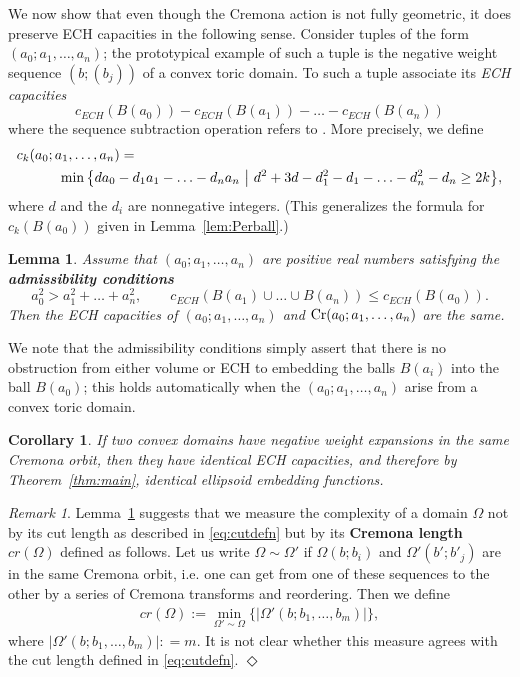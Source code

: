 \documentclass[11pt, reqno]{amsart}
\newtheorem{lemma}[thm]{Lemma}
\newtheorem{cor}[thm]{Corollary}
\theoremstyle{remark}
\numberwithin{equation}{subsection}
\numberwithin{figure}{section}
\theoremstyle{customremark}
\newtheorem{rmk_no_diamond}[thm]{Remark}
\newenvironment{rmk}{\begin{rmk_no_diamond} } {\hfill$\er$ \end{rmk_no_diamond}}
\newcommand{\Om}{{\Omega}}
\newcommand{\er}{{\Diamond}}
\begin{document}
We now show that even though the Cremona action is not fully geometric, it does preserve ECH capacities in the following sense.   Consider tuples of the form $(a_0; a_1, \ldots, a_n)$; 
the prototypical example of such a tuple is the negative weight sequence $(b; (b_j))$  of a convex toric domain.  To such a tuple associate its {\em ECH capacities} 
\[ c_{ECH}(B(a_0)) - c_{ECH}(B(a_1)) - \ldots - c_{ECH}(B(a_n))\] 
where the sequence subtraction operation refers to \cite{Hutchingsblog}.   More precisely, 
we define
\begin{align} &c_k(a_0; a_1, \ldots, a_n) =\\ \notag 
&\qquad\quad \min \big\{ d a_0 - d_1 a_1 - \ldots- d_n a_n\ \big|\  d^2 + 3d - d_1^2 - d_1 - \ldots - d_n^2 - d_n \ge 2k \big\},
\end{align}
where $d$ and the $d_i$ are nonnegative integers.  (This generalizes the formula for 
$ c_{k}(B(a_0))$ given in Lemma~\ref{lem:Perball}.)



\vspace{2 mm}
\begin{lemma}\label{lem:CremECH}
Assume that $(a_0; a_1, \ldots, a_n)$ are positive real numbers satisfying the {\bf admissibility conditions}
\[ a_0^2 > a_1^2 + \ldots + a_n^2, \quad \quad c_{ECH}( B(a_1) \cup \ldots \cup B(a_n) ) \le c_{ECH}( B(a_0) ).\]
Then the ECH capacities of $(a_0; a_1, \ldots, a_n)$ and 
${\rm Cr}(a_0; a_1, \ldots, a_n)$ are the same.
\end{lemma}

We note that the admissibility conditions simply assert that there is no obstruction from either volume or ECH to embedding the balls $B(a_i)$ into the ball $B(a_0)$; this holds automatically when the $(a_0;a_1,\ldots,a_n)$ arise from a convex toric domain.

\begin{cor}  If two convex domains have negative weight expansions in the same Cremona orbit, then they have identical ECH capacities, and therefore by Theorem~\ref{thm:main}, identical ellipsoid embedding functions. 
\end{cor}

\begin{rmk}\label{rmk:Crem} \rm  Lemma~\ref{lem:CremECH} suggests that we  measure the complexity of a domain $\Om$ not by its cut length as described in \eqref{eq:cutdefn}  but by its {\bf Cremona length}
$cr(\Omega)$ defined as follows. Let us write  $\Om\sim \Om'$  if  $\Om(b;b_i)$ and $\Om'(b';b'_j)$ are in the same Cremona orbit, i.e. one can get from one of these sequences to the other by a series of Cremona transforms and reordering. 
Then we define
\begin{align}\label{eq:Cremleng}
 cr(\Omega) := \min_{\Omega' \sim \Omega} \lbrace | \Omega'(b; b_1, \ldots, b_m)|  \rbrace,
 \end{align}
where $| \Omega'(b; b_1, \ldots, b_m)|: = m$.
It is not clear whether this measure   agrees with the cut length defined in \eqref{eq:cutdefn}.
\end{rmk}
\end{document}
